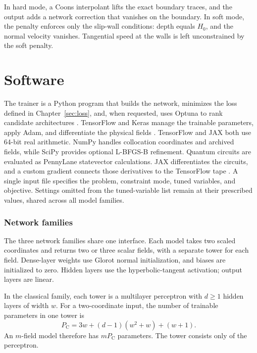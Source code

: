 \documentclass{erdc}
\begin{document}
In hard mode, a Coons interpolant lifts the exact boundary traces, and
the output adds a network correction that vanishes on the boundary. In
soft mode, the penalty enforces only the slip-wall conditions: depth
equals \(H_{0}\), and the normal velocity vanishes. Tangential speed at
the walls is left unconstrained by the soft penalty.


\chapter{Software}
\label{sec:software}

The trainer is a Python program that builds the network, minimizes the
loss defined in Chapter~\ref{sec:loss}, and, when requested, uses Optuna
to rank candidate architectures \cite{akiba2019optuna}. TensorFlow and
Keras manage the trainable parameters, apply Adam, and differentiate the
physical fields \cite{tensorflow2015}. TensorFlow and JAX both use
64-bit real arithmetic. NumPy handles collocation coordinates and
archived fields, while SciPy provides optional L-BFGS-B refinement.
Quantum circuits are evaluated as PennyLane statevector calculations.
JAX differentiates the circuits, and a custom gradient connects those
derivatives to the TensorFlow tape \cite{bergholm2018pennylane}. A
single input file specifies the problem, constraint mode, tuned
variables, and objective. Settings omitted from the tuned-variable list
remain at their prescribed values, shared across all model families.

\subsection{Network families}
\label{sec:families}

The three network families share one interface. Each model takes two
scaled coordinates and returns two or three scalar fields, with a
separate tower for each field. Dense-layer weights use Glorot normal
initialization, and biases are initialized to zero. Hidden layers use
the hyperbolic-tangent activation; output layers are linear.

In the classical family, each tower is a multilayer perceptron with
\(d\ge 1\) hidden layers of width \(w\). For a two-coordinate input,
the number of trainable parameters in one tower is
\begin{equation}
\label{eq:classical-count}
P_{\mathrm{C}}
= 3w + (d-1)(w^{2}+w) + (w+1).
\end{equation}
An \(m\)-field model therefore has \(mP_{\mathrm{C}}\) parameters. The
tower consists only of the perceptron.
\end{document}
